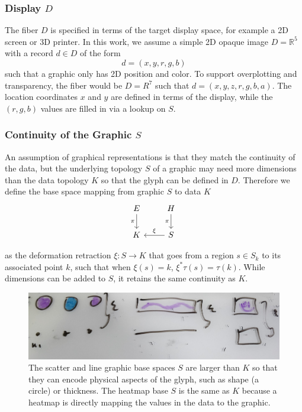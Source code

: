 \documentclass[../main.tex]{subfiles}
\begin{document}
\subsubsection{Display $D$}
\label{sec:graphic_fiber}
The fiber $D$ is specified in terms of the target display space, for example a 2D screen or 3D printer. In this work, we assume a simple 2D opaque image $D=\mathbb{R}^5$ with a record $d \in D$ of the form
\begin{equation}
    d = (x, y, r, g, b)
\end{equation}
such that a graphic only has 2D position and color. To support overplotting and transparency, the fiber would be $D=R^{7}$ such that $d=(x, y, z, r, g, b, a)$. The location coordinates $x$ and $y$ are defined in terms of the display, while the $(r,g,b)$ values are filled in via a lookup on $S$. 

\subsubsection{Continuity of the Graphic $S$} 
\label{sec:graphic_base}
An assumption of graphical representations is that they match the continuity of the data\cite{tufteVisualDisplayQuantitative2001,friendlyBriefHistoryData2008}, but the underlying topology $S$ of a graphic may need more dimensions than the data topology $K$ so that the glyph can be defined in $D$. Therefore we define the base space mapping from graphic $S$ to data $K$ 
\begin{equation}
    \begin{tikzcd}
        E \arrow[d, "\pi"'] & H \arrow[d, "\pi"'] \\
        K                   & S \arrow[l, "\xi"']
        \end{tikzcd}
\end{equation}

 as the deformation retraction \cite{RetractionTopology2020} $\xi: S \rightarrow K$ that goes from a region $s \in S_{k}$ to its associated point $k$, such that when $\xi(s) = k$, $\xi^*\tau(s) = \tau(k)$. While dimensions can be added to $S$, it retains the same continuity as $K$.
 
\begin{figure}
    \includegraphics[width=1\textwidth]{figures/math/retraction_maps.png}
    \caption{The scatter and line graphic base spaces $S$ are larger than $K$ so that they can encode physical aspects of the glyph, such as shape (a circle) or thickness. The heatmap base $S$ is the same as $K$ because a heatmap is directly mapping the values in the data to the graphic.
    }
    \label{fig:graphic_retraction_map}
\end{figure}
\end{document}
